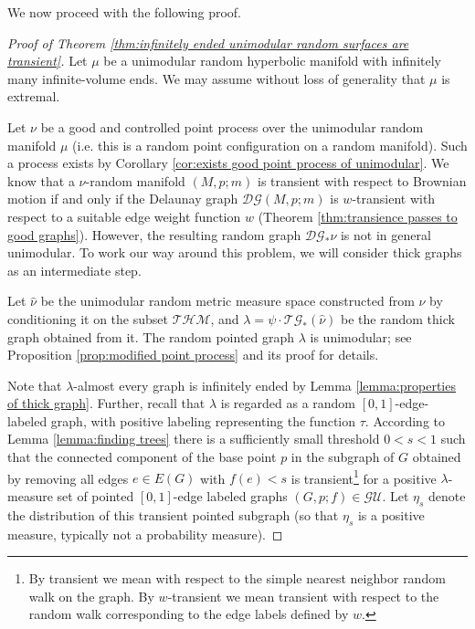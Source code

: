 \documentclass{amsart}
\newcommand{\GraphsU}{\mathcal{GU}}
\newcommand{\DelanGraph}{\mathcal{DG}}
\newcommand{\ThickGraph}{\mathcal{TG}}
\newcommand{\ThickHypersP}{\mathcal{THM}}
\theoremstyle{plain}
\numberwithin{equation}{section}
\theoremstyle{definition}
\begin{document}
We now proceed with the following proof.

\begin{proof}[Proof of Theorem \ref{thm:infinitely ended unimodular random surfaces are transient}]
Let $\mu$ be a unimodular random hyperbolic manifold with infinitely many infinite-volume ends. We may assume without loss of generality that $\mu$ is extremal.

Let $\nu$ be a good and controlled point process over the unimodular random manifold $\mu$ (i.e. this is a random point configuration on a random manifold). Such a process exists by Corollary \ref{cor:exists good point process of unimodular}.  We know that a $\nu$-random manifold $(M,p;m)$ is transient with respect to Brownian motion if and only if the Delaunay graph $\DelanGraph (M,p;m)$ is $w$-transient with respect to a suitable edge weight function $w$ (Theorem \ref{thm:transience passes to good graphs}). However, the resulting random graph $\DelanGraph_* \nu$ is not in general unimodular. To work our way around this problem, we will consider thick graphs as an intermediate step. 

Let $\widehat{\nu}$ be the unimodular random metric measure space constructed from $\nu$ by conditioning it on the subset $\ThickHypersP$, and  $\lambda = \psi \cdot \ThickGraph_* (\widehat{\nu})$ be the random thick graph obtained from it. The random pointed graph $\lambda$ is unimodular; see Proposition \ref{prop:modified point process} and its proof for details. 

Note that  $\lambda$-almost every graph is infinitely ended by Lemma \ref{lemma:properties of thick graph}. Further, recall that $\lambda$ is regarded as a random $\left[0,1\right]$-edge-labeled graph, with positive labeling
representing the function $\tau$.  According to Lemma \ref{lemma:finding trees} there is a sufficiently small threshold $0 < s < 1$ such that the connected component of the base point $p$ in the subgraph of $G$ obtained by removing all edges $e \in E(G)$ with $f(e) < s$ is transient\footnote{By transient we mean with respect to the simple nearest neighbor random walk on the graph. By $w$-transient we mean transient with respect to the random walk corresponding to the edge labels defined by $w$.} for a positive $\lambda$-measure set of pointed $\left[0,1\right]$-edge labeled graphs $(G,p;f) \in \GraphsU$. Let $\eta_s$ denote the distribution of this transient pointed subgraph (so that $\eta_s$ is a positive measure, typically not a probability measure).


\end{proof}
\end{document}
